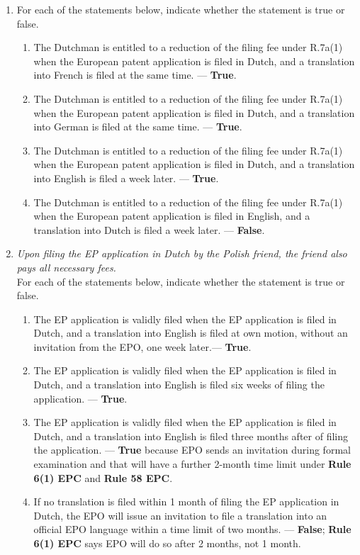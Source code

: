 \documentclass{report}
\begin{document}
\begin{enumerate}[label=\textbf{Answer \arabic*}]
\begin{enumerate}[label=\textbf{Answer \arabic*}]
\begin{enumerate}[label=(\alph*)]
        \item For each of the statements below, indicate whether the statement is true or false.
        \begin{enumerate}[label={(\alph{enumi}.\arabic*)}]
            \item The Dutchman is entitled to a reduction of the filing fee under R.7a(1) when the European patent application is filed in Dutch, and a translation into French is filed at the same time. --- \textbf{True}.
            \item The Dutchman is entitled to a reduction of the filing fee under R.7a(1) when the European patent application is filed in Dutch, and a translation into German is filed at the same time. --- \textbf{True}.
            \item The Dutchman is entitled to a reduction of the filing fee under R.7a(1) when the European patent application is filed in Dutch, and a translation into English is filed a week later. --- \textbf{True}.
            \item The Dutchman is entitled to a reduction of the filing fee under R.7a(1) when the European patent application is filed in English, and a translation into Dutch is filed a week later. --- \textbf{False}.
        \end{enumerate}
        
        \item \textit{Upon filing the EP application in Dutch by the Polish friend, the friend also pays all necessary fees.} \\
        For each of the statements below, indicate whether the statement is true or false.
        \begin{enumerate}[label={(\alph{enumi}.\arabic*)}]
            \item The EP application is validly filed when the EP application is filed in Dutch, and a translation into English is filed at own motion, without an invitation from the EPO, one week later.--- \textbf{True}.
            \item The EP application is validly filed when the EP application is filed in Dutch, and a translation into English is filed six weeks of filing the application. --- \textbf{True}.
            \item The EP application is validly filed when the EP application is filed in Dutch, and a translation into English is filed three months after of filing the application. --- \textbf{True} because EPO sends an invitation during formal examination and that will have a further 2-month time limit under \textbf{Rule 6(1) EPC} and \textbf{Rule 58 EPC}.
            \item If no translation is filed within 1 month of filing the EP application in Dutch, the EPO will issue an invitation to file a translation into an official EPO language within a time limit of two months. --- \textbf{False}; \textbf{Rule 6(1) EPC} says EPO will do so after 2 months, not 1 month.
        \end{enumerate}
    \end{enumerate}


\end{enumerate}
\end{enumerate}
\end{document}
